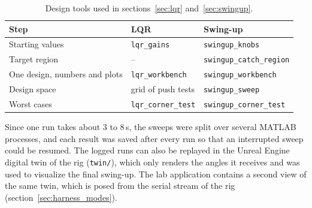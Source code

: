 \documentclass[a4paper,11pt]{article}
\begin{document}
\begin{table}[h]
\centering
\caption{Design tools used in sections~\ref{sec:lqr} and~\ref{sec:swingup}.}
\label{tab:harness_tools}
\small
\begin{tabular}{@{}lll@{}}
\toprule
Step & LQR & Swing-up \\
\midrule
Starting values & \texttt{lqr\_gains} & \texttt{swingup\_knobs} \\
Target region & -- & \texttt{swingup\_catch\_region} \\
One design, numbers and plots & \texttt{lqr\_workbench} & \texttt{swingup\_workbench} \\
Design space & grid of push tests & \texttt{swingup\_sweep} \\
Worst cases & \texttt{lqr\_corner\_test} & \texttt{swingup\_corner\_test} \\
\bottomrule
\end{tabular}
\end{table}

Since one run takes about 3 to 8\,s, the sweeps were split over several MATLAB processes, and each result was saved after every run so that an interrupted sweep could be resumed. The logged runs can also be replayed in the Unreal Engine digital twin of the rig (\nolinkurl{twin/}), which only renders the angles it receives and was used to visualize the final swing-up. The lab application contains a second view of the same twin, which is posed from the serial stream of the rig (section~\ref{sec:harness_modes}).
\end{document}
